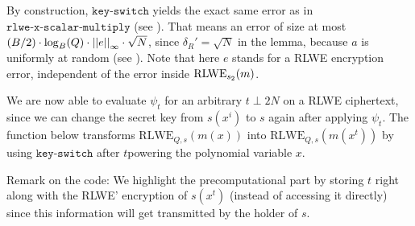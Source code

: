 \documentclass[letterpaper,10pt,english]{jupyterBook}
\begin{document}
\sphinxAtStartPar
By construction, \(\texttt{key-switch}\) yields the exact same error as in \(\texttt{rlwe-x-scalar-multiply}\) (see {\hyperref[\detokenize{Thesis:error-after-rlwe-x-scalar-multiply}]{}}).
That means an error of size at most \((B/2) \cdot \log_B(Q) \cdot \left\lvert\left\lvert e \right\rvert\right\rvert_\infty \cdot \sqrt{N}\), since \(\delta_R' = \sqrt{N}\) in the lemma, because \(a\) is uniformly at random (see {\hyperref[\detokenize{Thesis:conclusion-on-delta-r}]{}}).
Note that here \(e\) stands for a RLWE encryption error, independent of the error inside \(\mathrm{RLWE}_{s_2}(m)\).

\begin{DUlineblock}{0em}
\item[] 
\end{DUlineblock}

\sphinxAtStartPar
We are now able to evaluate \(\psi_t\) for an arbitrary \(t\perp 2N\) on a RLWE ciphertext, since we can change the secret key from \(s(x^i)\) to \(s\) again after applying \(\psi_t\).
The function below transforms \(\mathrm{RLWE}_{Q,s}(m(x))\) into \(\mathrm{RLWE}_{Q,s}(m(x^t))\) by using \(\texttt{key-switch}\) after \(t\)\sphinxhyphen{}powering the polynomial variable \(x\).

\sphinxAtStartPar
Remark on the code:
We highlight the pre\sphinxhyphen{}computational part by storing \(t\) right along with the RLWE’ encryption of \(s(x^t)\) (instead of accessing it directly) since this information will get transmitted by the holder of \(s\).
\end{document}
